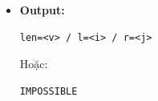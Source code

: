 \begin{itemize}
\begin{itemize}
        \item \textbf{Module 3 (Ghi file):}
        \begin{itemize}
            \item Nếu tồn tại:
\begin{lstlisting}
len=<v> / l=<i> / r=<j>
\end{lstlisting}
            \item Ngược lại ghi \texttt{IMPOSSIBLE}
        \end{itemize}
    \end{itemize}

    \item \textbf{Output:}
\begin{lstlisting}
len=<v> / l=<i> / r=<j>
\end{lstlisting}
Hoặc:
\begin{lstlisting}
IMPOSSIBLE
\end{lstlisting}
\end{itemize}

